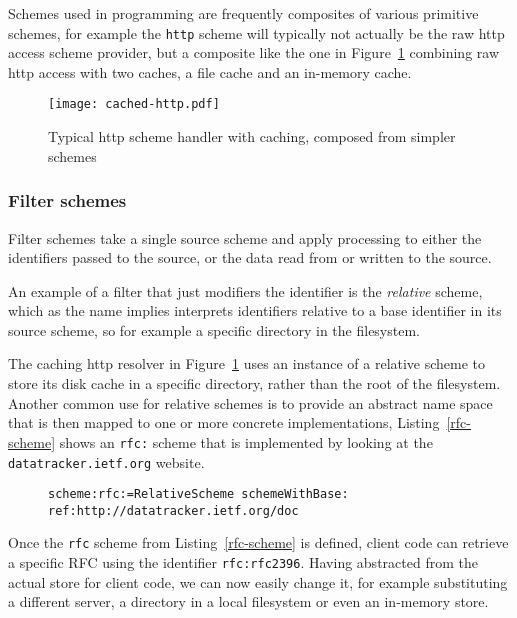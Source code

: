 \documentclass[preprint,authoryear]{llncs}
\begin{document}
 Schemes used in programming 
are frequently composites of various primitive schemes, for example
the {\tt http} scheme will typically not actually be the raw http access
scheme provider, but a composite like the one in Figure~\ref{fig:http-cached} combining
raw http access with two caches, a file cache and an in-memory cache.


\begin{figure}[htbp]
\begin{center}
\texttt{[image: cached-http.pdf]}
\caption{Typical http scheme handler with caching, composed from simpler schemes}
\label{fig:http-cached}
\end{center}
\end{figure}


\subsubsection{Filter schemes}
\label{filterschemes}
Filter schemes take a single source scheme and apply processing to either
the identifiers passed to the source, or the data read from or written to the source.

An example of a filter that just modifiers the identifier is the \emph{relative}
scheme, which as the name implies interprets identifiers relative to a base
identifier in its source scheme, so for example a specific directory in the
filesystem.  

The caching http resolver in Figure~\ref{fig:http-cached} uses an instance
of a relative scheme to store its disk cache in a specific directory, rather
than the root of the filesystem.  Another common use for relative schemes
is to provide an abstract name space that is then mapped to one
or more  concrete implementations, Listing~\ref{rfc-scheme} shows
an {\tt rfc:} scheme that is implemented by looking at the {\tt datatracker.ietf.org}
website.


\begin{figure}[htbp]
\begin{lstlisting}[style=L,label=rfc-scheme,caption=Defining a custom rfc: scheme.]
scheme:rfc:=RelativeScheme schemeWithBase: ref:http://datatracker.ietf.org/doc
\end{lstlisting}
\end{figure}

Once the {\tt rfc} scheme from Listing~\ref{rfc-scheme} is defined, client code can 
retrieve a specific RFC using the identifier {\tt  rfc:rfc2396}.  Having abstracted
from the actual store for client code, we can now easily change it, for example
substituting a different server, a directory in a local filesystem or even an 
in-memory store.
\end{document}
